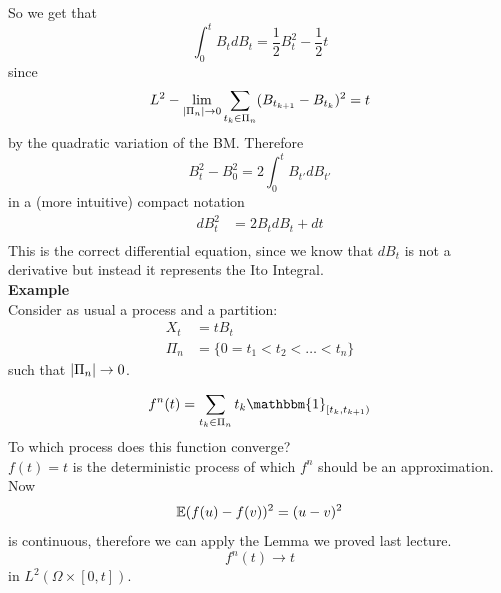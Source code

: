 So we get that 
\begin{equation*}
    \int_0^t B_t dB_t = \frac{1}{2} B^2_t - \frac{1}{2} t
\end{equation*}
since 
\begin{equation*}
    L^2-\lim_{|\Pi_n|\rightarrow 0}\sum_{t_k \in \Pi_n}(B_{t_{k+1}}-B_{t_{k}})^2 = t
\end{equation*}
by the quadratic variation of the BM.
Therefore
\begin{equation*}
    B^2_t - B^2_0 = 2 \int_0^t B_{t'} dB_{t'}
\end{equation*}
in a (more intuitive) compact notation 
\begin{equation*}
\begin{split}
     dB_t^2&= 2 B_t dB_t + dt \\
\end{split}
\end{equation*}
This is the correct differential equation, since we know that $dB_t$ is not a derivative but instead it represents the Ito Integral. \\
\textbf{Example} \\
Consider as usual a process and a partition: 
\begin{equation*}
\begin{split}
     X_t&= t B_t\\
     \Pi_n&=\{0 =t_1 < t_2 < \dots < t_n\}
\end{split}
\end{equation*}
such that $|\Pi_n|\rightarrow 0$.

\begin{equation*}
    f^n(t) = \sum_{t_k \in \Pi_n} t_k \mathbbm{1}_{[t_k, t_{k+1})}
\end{equation*}
To which process does this function converge? \\
$f(t) = t$ is the deterministic process of which $f^n$ should be an approximation. Now
\begin{equation*}
    \mathbb{E}(f(u) - f(v))^2 = (u-v)^2
\end{equation*}
is continuous, therefore we can apply the Lemma we proved last lecture. 
\begin{equation*}
    f^n(t) \rightarrow t 
\end{equation*}
in $L^2(\Omega \times [0,t])$.\\

